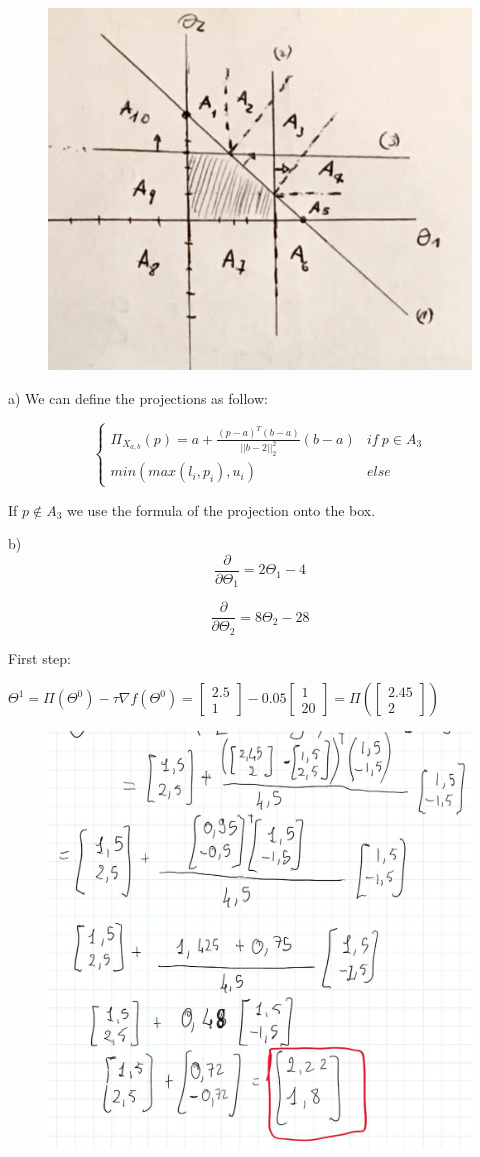 \documentclass[12pt,letterpaper]{article}
\begin{document}
\begin{figure}[H]
\centering
\includegraphics[width=0.6\linewidth]{pl.png}
\end{figure}



a) We can define the projections as follow:

\[ \begin{cases} 
      \Pi_X_{a,b}(p) = a+\frac{(p-a)^T(b-a)}{||b-2||_2^2}(b-a)  &     if\ p \in A_3\\
       min(max(l_i, p_i), u_i) & else
   \end{cases}
\]

If $p \not \in A_3$ we use the formula of the projection onto the box.

b) 
$$\frac{\partial }{\partial \Theta_1} = 2\Theta_1-4$$ 

$$\frac{\partial }{\partial \Theta_2} = 8\Theta_2-28$$ 

First step: 

$\Theta^1 = \Pi(\Theta^0)- \tau\nabla f(\Theta^0) =  \begin{bmatrix}2.5 \\ 1\end{bmatrix} - 0.05\begin{bmatrix}1 \\ 20\end{bmatrix} = \Pi(\begin{bmatrix}2.45 \\ 2\end{bmatrix})$
$$$$

\begin{figure}[H]
\centering
  \includegraphics[width=0.6\linewidth]{1.jpeg}
\end{figure}
\end{document}

